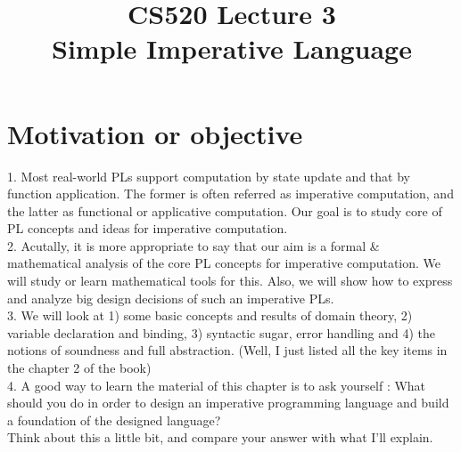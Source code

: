 \documentclass{report}[12pt]
\begin{document}
  {\topsep}{\topsep}%
  {\itshape}{}%
  {\bfseries}{}%
  {\newline}{}%

\theoremstyle{break}

\newtheorem{theorem}{Theorem}[section]
\newtheorem{definition}{Definition}
\newtheorem{proposition}{Proposition}
\newtheorem{corollary}{Corollary}
\newtheorem{lemma}{Lemma}
\newtheorem{example}{Example}
\newcommand{\nonterminal}[1]{\langle \text{#1}\rangle}
\newcommand{\rem}[0]{\text{ rem }}
\newcommand{\interp}[1]{\llbracket #1 \rrbracket}
\newcommand{\bbot}[0]{\Perp}
\newcommand{\TODO}[1]{TODO : #1}

\setcounter{chapter}{3}

\title{CS520 Lecture 3\\Simple Imperative Language}
\Large
\maketitle

\section{Motivation or objective}
1. Most real-world PLs support computation by state update and that by function application. The former is often referred as imperative computation, and the latter as functional or applicative computation. Our goal is to study core of PL concepts and ideas for imperative computation. \\
2. Acutally, it is more appropriate to say that our aim is a formal \& mathematical analysis of the core PL concepts for imperative computation. We will study or learn mathematical tools for this. Also, we will show how to express and analyze big design decisions of such an imperative PLs. \\
3. We will look at 1) some basic concepts and results of domain theory, 2) variable declaration and binding, 3) syntactic sugar, error handling and 4) the notions of soundness and full abstraction. (Well, I just listed all the key items in the chapter 2 of the book) \\
4. A good way to learn the material of this chapter is to ask yourself : What should you do in order to design an imperative programming language and build a foundation of the designed language? \\
Think about this a little bit, and compare your answer with what I'll explain.
\end{document}
